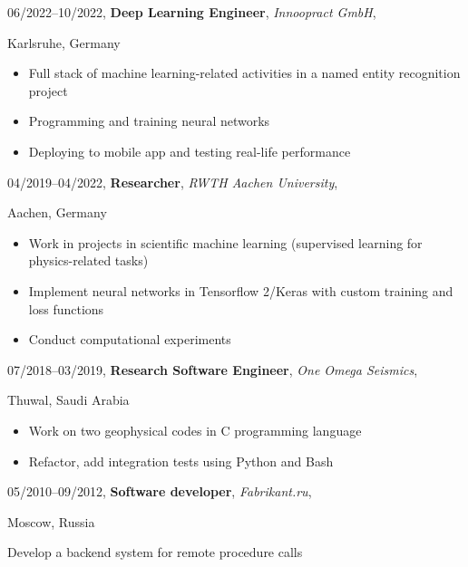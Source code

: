 \documentclass[11pt,a4paper]{article}
\newcommand{\header}[4]{%
#1,
\textbf{#2},
\emph{#3},
#4
}
\begin{document}
\header{
06/2022--10/2022}{
Deep Learning Engineer}{
Innoopract GmbH}{
Karlsruhe, Germany}

\begin{itemize}
\item Full stack of machine learning-related activities
      in a named entity recognition project
\item Programming and training neural networks
\item Deploying to mobile app and testing real-life performance
\end{itemize}
\vspace{\parskip}


\header{
04/2019--04/2022}{
Researcher}{
RWTH Aachen University}{
Aachen, Germany}

\begin{itemize}
\item Work in projects in scientific machine learning
      (supervised learning for physics-related tasks)
\item Implement neural networks in Tensorflow 2/Keras
      with custom training and loss functions
\item Conduct computational experiments
\end{itemize}
\vspace{\parskip}


\header{
07/2018--03/2019}{
Research Software Engineer}{
One Omega Seismics}{
Thuwal, Saudi Arabia}

\begin{itemize}
  \item Work on two geophysical codes in C programming language
  \item Refactor, add integration tests using Python and Bash
\end{itemize}
\vspace{\parskip}


\header{
05/2010--09/2012}{
Software developer}{
Fabrikant.ru}{
Moscow, Russia}

Develop a backend system for remote procedure calls
\vspace{\parskip}


\end{document}
